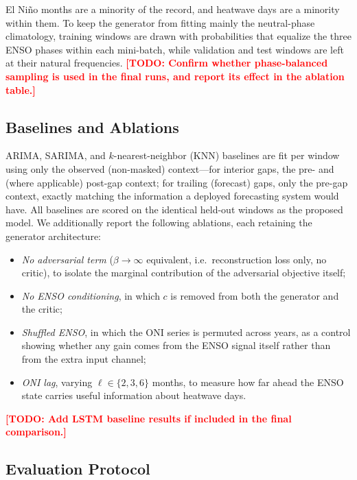 \documentclass[conference]{IEEEtran}
\newcommand{\TODO}[1]{\textcolor{red}{\textbf{[TODO: #1]}}}
\begin{document}
El Ni\~{n}o months are a minority of the record, and heatwave days are a minority within them. To keep
the generator from fitting mainly the neutral-phase climatology, training windows are drawn with
probabilities that equalize the three ENSO phases within each mini-batch, while validation and test
windows are left at their natural frequencies. \TODO{Confirm whether phase-balanced sampling is used in
the final runs, and report its effect in the ablation table.}

\subsection{Baselines and Ablations}

ARIMA, SARIMA, and $k$-nearest-neighbor (KNN) baselines are fit per window using only the observed
(non-masked) context---for interior gaps, the pre- and (where applicable) post-gap context; for
trailing (forecast) gaps, only the pre-gap context, exactly matching the information a deployed
forecasting system would have. All baselines are scored on the identical held-out windows as the
proposed model. We additionally report the following ablations, each retaining the generator
architecture:
\begin{itemize}
    \item \emph{No adversarial term} ($\beta \to \infty$ equivalent, i.e.\ reconstruction loss only, no
    critic), to isolate the marginal contribution of the adversarial objective itself;
    \item \emph{No ENSO conditioning}, in which $c$ is removed from both the generator and the critic;
    \item \emph{Shuffled ENSO}, in which the ONI series is permuted across years, as a control showing
    whether any gain comes from the ENSO signal itself rather than from the extra input channel;
    \item \emph{ONI lag}, varying $\ell \in \{2, 3, 6\}$ months, to measure how far ahead the ENSO state
    carries useful information about heatwave days.
\end{itemize}
\TODO{Add LSTM baseline results if included in the final comparison.}

\subsection{Evaluation Protocol}
\end{document}
